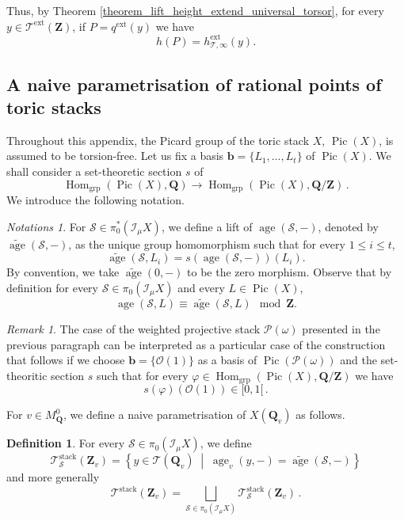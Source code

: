 \documentclass{proc-l}
\newcommand{\Z}{\mathbf{Z}}
\newcommand{\Q}{\mathbf{Q}}
\newcommand{\base}{\mathbf{b}}
\DeclareMathOperator{\Pic}{Pic}
\DeclareMathOperator{\grp}{grp}
\DeclareMathOperator{\Hom}{Hom}
\DeclareMathOperator{\stack}{stack}
\DeclareMathOperator{\age}{age}
\DeclareMathOperator{\ext}{ext}
\newcommand{\stackS}{\mathcal{S}}
\newcommand{\stackT}{\mathcal{T}}
\newcommand{\stackP}{\mathcal{P}}
\newcommand{\sheafI}{\mathcal{I}}
\newcommand{\sheafO}{\mathcal{O}}
\newcommand{\w}{\omega}
\newcommand{\sector}{\pi_0(\sheafI_{\mu} X)}
\newcommand{\twistsector}{\pi_0^*(\sheafI_{\mu} X)}
\theoremstyle{definition}
\newtheorem{definition}[theorem]{Definition}
\theoremstyle{remark}
\newtheorem{remark}[theorem]{Remark}
\newtheorem{Notations}[theorem]{Notations}
\numberwithin{equation}{section}
\begin{document}
Thus, by Theorem \ref{theorem_lift_height_extend_universal_torsor}, for every $y \in \stackT^{\ext}(\Z)$, if $P = q^{\ext}(y)$ we have
$$
h(P) = h_{\stackT,\infty}^{\ext}(y).
$$






\subsection{A naive parametrisation of rational points of toric stacks}





Throughout this appendix, the Picard group of the toric stack $X$, $\Pic(X)$, is assumed to be torsion-free. Let us fix a basis $\base = \{ L_1,\ldots,L_t \}$ of $\Pic(X)$. We shall consider a set-theoretic section $s$ of
$$
\Hom_{\grp}(\Pic(X),\Q) \longrightarrow \Hom_{\grp}(\Pic(X),\Q / \Z) \, .
$$We introduce the following notation.

\begin{Notations}
For $\stackS \in \twistsector$, we define a lift of $\age(\stackS,-)$, denoted by $\widetilde{\age}(\stackS,-)$, as the unique group homomorphism such that for every $1 \leqslant i \leqslant t$,
$$
\widetilde{\age}(\stackS,L_i)
=
s\!\left(\age(\stackS,-)\right)(L_i).
$$By convention, we take $\widetilde{\age}(0,-)$ to be the zero morphism. Observe that by definition for every $\stackS \in \sector$ and every $L \in \Pic(X)$,
$$
\age(\stackS,L) \equiv \widetilde{\age}(\stackS,L) \mod \Z .
$$
\end{Notations}


\begin{remark}\label{remark_choice_section_weighted_proj_stack}
The case of the weighted projective stack $\stackP(\w)$ presented in the previous paragraph can be interpreted as a particular case of the construction that follows if we choose $\base = \{ \sheafO(1) \}$ as a basis of $\Pic(\stackP(\w))$ and the set-theoritic section $s$ such that for every $\varphi \in \Hom_{\grp}(\Pic(X),\Q / \Z)$ we have
$$
s(\varphi)(\sheafO(1)) \in [0,1[ \, .
$$
\end{remark}

For $v \in M_{\Q}^0$, we define a naive parametrisation of $X(\Q_v)$ as follows.

\begin{definition}
For every $\stackS \in \sector$, we define
$$
\stackT^{\stack}_{\stackS}(\Z_v)
=
\left\{
y \in \stackT(\Q_v)
\;\middle|\;
\age_v(y,-) = \widetilde{\age}(\stackS,-)
\right\}
$$
and more generally
$$
\stackT^{\stack}(\Z_v)
=
\bigsqcup\limits_{\stackS \in \sector}
\stackT^{\stack}_{\stackS}(\Z_v) \, .
$$
\end{definition}
\end{document}
